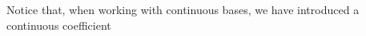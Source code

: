 Notice that, when working with continuous bases, we have introduced a continuous coefficient










    
